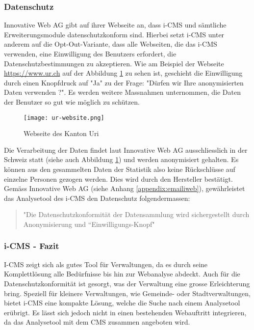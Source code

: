 \newpage

\subsubsection{Datenschutz}
Innovative Web AG gibt auf ihrer Webseite \parencite{iwebwebsiteKanotonWeb} an, dass i-CMS und sämtliche Erweiterungsmodule datenschutzkonform sind. Hierbei setzt i-CMS unter anderem auf die Opt-Out-Variante, dass alle Webseiten, die das i-CMS verwenden, eine Einwilligung des Benutzers erfordert, die Datenschutzbestimmungen zu akzeptieren. Wie am Beispiel der Webseite \url{https://www.ur.ch} auf der Abbildung \ref{fig: urweb} zu sehen ist, geschieht die Einwilligung durch einen Knopfdruck auf "Ja" zu der Frage: "Dürfen wir Ihre anonymisierten Daten verwenden ?". Es werden weitere Massnahmen unternommen, die Daten der Benutzer so gut wie möglich zu schützen.

\begin{figure}[h]
  \centering
  \texttt{[image: ur-website.png]}
  \caption{Webseite des Kanton Uri \parencite{webseiteKantonUri}}
  \label{fig: urweb}
\end{figure}

Die Verarbeitung der Daten findet laut Innovative Web AG \parencite{iwebwebsiteCMS} ausschliesslich in der Schweiz statt (siehe auch Abbildung \ref{fig: urweb}) und werden anonymisiert gehalten. Es können aus den gesammelten Daten der Statistik also keine Rückschlüsse auf einzelne Personen gezogen werden. Dies wird durch den Hersteller bestätigt. Gemäss Innovative Web AG (siehe Anhang \ref{appendix:emailiweb}), gewährleistet das Analysetool des i-CMS den Datenschutz folgendermassen:

\begin{quote}
  "Die Datenschutzkonformität der Datensammlung wird sichergestellt durch Anonymisierung und “Einwilligungs-Knopf"
\end{quote}

\subsubsection{i-CMS - Fazit}

I-CMS zeigt sich als gutes Tool für Verwaltungen, da es durch seine Komplettlösung alle Bedürfnisse bis hin zur Webanalyse abdeckt. Auch für die Datenschutzkonformität ist gesorgt, was der Verwaltung eine grosse Erleichterung bring. Speziell für kleinere Verwaltungen, wie Gemeinde- oder Stadtverwaltungen, bietet i-CMS eine kompakte Lösung, welche die Suche nach einem Analysetool erübrigt. Es lässt sich jedoch nicht in einen bestehenden Webauftritt integrieren, da das Analysetool mit dem CMS zusammen angeboten wird. 

